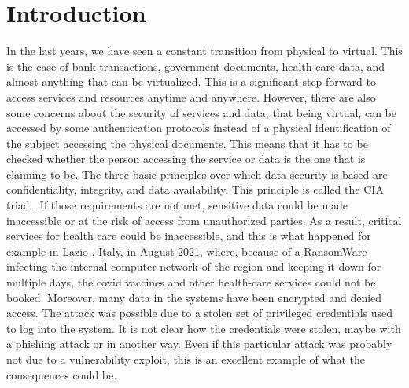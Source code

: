 \chapter{Introduction}
\label{chap:introduction}
In the last years, we have seen a constant transition from physical to virtual. This is the case of bank transactions, government documents, health care data, and almost anything that can be virtualized. This is a significant step forward to access services and resources anytime and anywhere. However, there are also some concerns about the security of services and data, that being virtual, can be accessed by some authentication protocols instead of a physical identification of the subject accessing the physical documents. This means that it has to be checked whether the person accessing the service or data is the one that is claiming to be. The three basic principles over which data security is based are confidentiality, integrity, and data availability. This principle is called the CIA triad \cite{cia_triad}.
If those requirements are not met, sensitive data could be made inaccessible or at the risk of access from unauthorized parties. As a result, critical services for health care could be inaccessible, and this is what happened for example in Lazio \cite{lazio_hacker_0,lazio_hacker_1}, Italy, in August 2021, where, because of a RansomWare infecting the internal computer network of the region and keeping it down for multiple days, the covid vaccines and other health-care services could not be booked. Moreover, many data in the systems have been encrypted and denied access. The attack was possible due to a stolen set of privileged credentials used to log into the system. It is not clear how the credentials were stolen, maybe with a phishing attack or in another way. Even if this particular attack was probably not due to a vulnerability exploit, this is an excellent example of what the consequences could be. 


